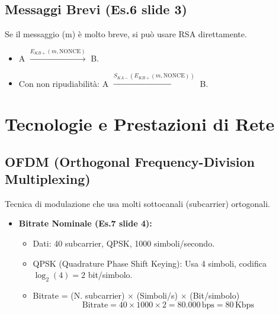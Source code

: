 \subsection{Messaggi Brevi (Es.6 slide 3)}
Se il messaggio (m) è molto breve, si può usare RSA direttamente.
\begin{itemize}
    \item A $\xrightarrow{E_{KB+}(m, \text{NONCE})}$ B.
    \item Con non ripudiabilità: A $\xrightarrow{S_{KA-}(E_{KB+}(m, \text{NONCE}))}$ B.
\end{itemize}

\section{Tecnologie e Prestazioni di Rete}

\subsection{OFDM (Orthogonal Frequency-Division Multiplexing)}
Tecnica di modulazione che usa molti sottocanali (subcarrier) ortogonali.
\begin{itemize}
    \item \textbf{Bitrate Nominale (Es.7 slide 4):}
    \begin{itemize}
        \item Dati: 40 subcarrier, QPSK, 1000 simboli/secondo.
        \item QPSK (Quadrature Phase Shift Keying): Usa 4 simboli, codifica $\log_2(4) = 2$ bit/simbolo.
        \item Bitrate = (N. subcarrier) $\times$ (Simboli/s) $\times$ (Bit/simbolo)
        \[ \text{Bitrate} = 40 \times 1000 \times 2 = 80.000 \, \text{bps} = 80 \, \text{Kbps} \]
    \end{itemize}
\end{itemize}

